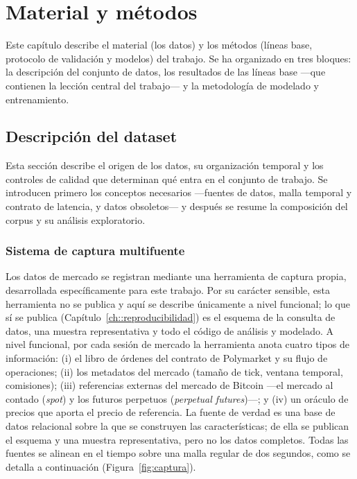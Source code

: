 %
\chapter{Material y métodos}
\label{ch::metodos}

Este capítulo describe el material (los datos) y los métodos (líneas base, protocolo de
validación y modelos) del trabajo. Se ha organizado en tres bloques: la descripción del
conjunto de datos, los resultados de las líneas base —que contienen la lección central del
trabajo— y la metodología de modelado y entrenamiento.

\section{Descripción del dataset}

Esta sección describe el origen de los datos, su organización temporal y los controles de
calidad que determinan qué entra en el conjunto de trabajo. Se introducen primero los
conceptos necesarios —fuentes de datos, malla temporal y contrato de latencia, y datos
obsoletos— y después se resume la composición del corpus y su análisis exploratorio.

\subsection{Sistema de captura multifuente}

Los datos de mercado se registran mediante una herramienta de captura propia, desarrollada
específicamente para este trabajo. Por su carácter sensible, esta herramienta no se publica y
aquí se describe únicamente a nivel funcional; lo que sí se publica
(Capítulo~\ref{ch::reproducibilidad}) es el esquema de la consulta de datos, una muestra
representativa y todo el código de análisis y modelado. A nivel funcional, por cada sesión de
mercado la herramienta anota cuatro tipos de información: (i) el libro de órdenes del contrato
de Polymarket y su flujo de operaciones; (ii) los metadatos del mercado (tamaño de tick,
ventana temporal, comisiones); (iii) referencias externas del mercado de Bitcoin —el mercado
al contado (\emph{spot}) y los futuros perpetuos (\emph{perpetual futures})—; y (iv) un
oráculo de precios que aporta el precio de referencia. La fuente de verdad es una base de
datos relacional sobre la que se construyen las características; de ella se publican el
esquema y una muestra representativa, pero no los datos completos. Todas las fuentes se
alinean en el tiempo sobre una malla regular de dos segundos, como se detalla a continuación
(Figura~\ref{fig:captura}).

